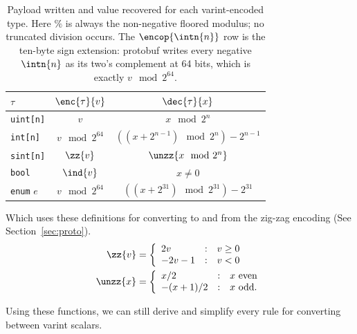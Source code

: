\begin{table}[H]
  \centering
  \begin{tabular}{l c c}
    \toprule
    $\tau$ & $\enc{\tau}{v}$ & $\dec{\tau}{x}$ \\
    \midrule
    \texttt{uint[n]} & $v$ & $x \mod 2^n$ \\
    \texttt{int[n]} & $v \mod 2^{64}$ & $((x + 2^{n-1}) \mod 2^n) - 2^{n-1}$ \\
    \texttt{sint[n]} & $\zz{v}$ & $\unzz{x \mod 2^n}$ \\
    \texttt{bool} & $\ind{v}$ & $x \ne 0$ \\
    {\color{red} \texttt{enum} $e$} & $v \mod 2^{64}$ & $((x + 2^{31}) \mod 2^{31}) - 2^{31}$ \\
    \bottomrule
  \end{tabular}
  \caption[Encoding and decoding rules for Varint conversions.]{Payload written
    and value recovered for each varint-encoded type. Here $\%$ is always the
    non-negative floored modulus; no truncated division occurs. The
    $\encop{\intn{n}}$ row is the ten-byte sign extension: protobuf writes every
    negative $\intn{n}$ as its two's complement at 64 bits, which is exactly
    $v \mod 2^{64}$.
  }
  \label{tab:varint-conversion}
\end{table}

Which uses these definitions for converting to and from the zig-zag encoding
(See Section~\ref{sec:proto}).
\begin{align*}
  \zz{v} &= \left\{
    \begin{array}{l@{\quad:\quad}l}
      2v & v \ge 0 \\
      -2v - 1 & v < 0
    \end{array}\right. \\
  \unzz{x} &= \left\{
    \begin{array}{l@{\quad:\quad}l}
      x / 2 & x \text{ even} \\
      -(x + 1) / 2 & x \text{ odd.}
    \end{array}\right.
\end{align*}

Using these functions, we can still derive and simplify every rule for
converting between varint scalars.

